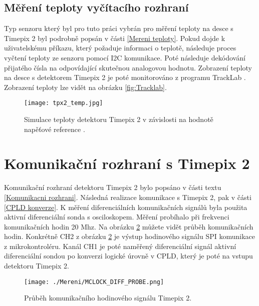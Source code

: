 \subsection{Měření teploty vyčítacího rozhraní}
Typ senzoru který byl pro tuto práci vybrán pro měření teploty na desce s Timepix 2 byl podrobně popsán v části \ref{Mereni teploty}. Pokud dojde k uživatelskému příkazu, který požaduje informaci o teplotě, následuje proces vyčtení teploty ze senzoru pomocí I2C komunikace. Poté následuje dekódování přijatého čísla na odpovídající skutečnou analogovou hodnotu. Zobrazení teploty na desce s detektorem Timepix 2 je poté monitorováno z programu TrackLab \cite{Manek_2024}. Zobrazení teploty lze vidět na obrázku \ref{fig:Tracklab}.

\begin{figure}[h!]
	\centering
	\captionsetup{justification=centering}
	\texttt{[image: tpx2\_temp.jpg]}
	\caption{Simulace teploty detektoru Timepix 2 v závislosti na hodnotě napěťové reference \cite{tpx2_manual}.} 
	\label{fig:tpx2_temp}
\end{figure}

\section{Komunikační rozhraní s Timepix 2}		%
Komunikační rozhraní detektoru Timepix 2 bylo popsáno v části textu \ref{Komunikacni rozhrani}. Následná  realizace komunikace s Timepix 2, pak v části \ref{CPLD konverze}. K měření diferenciálních komunikačních signálů byla použita aktivní diferenciální sonda s osciloskopem. Měření probíhalo při frekvenci komunikačních hodin 20 Mhz. Na obrázku \ref{fig:MCLOCK_DIFF_PROBE} můžete vidět průběh komunikačních hodin. Konkrétně CH2 z obrázku \ref{fig:MCLOCK_DIFF_PROBE} je výstup hodinového signálu SPI komunikace z mikrokontroléru. Kanál CH1 je poté naměřený diferenciální signál aktivní diferenciální sondou po konverzi logické úrovně v CPLD, který je poté na vstupu detektoru Timepix 2.  
\begin{figure}[h!]
	\centering
	\captionsetup{justification=centering}
	\texttt{[image: ./Mereni/MCLOCK\_DIFF\_PROBE.png]}
	\caption{Průběh komunikačního hodinového signálu Timepix 2.} 
	\label{fig:MCLOCK_DIFF_PROBE}
\end{figure}

